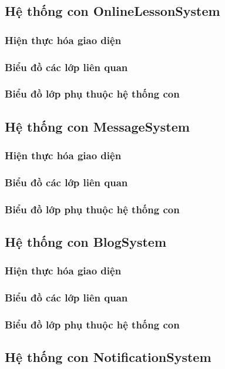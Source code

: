\documentclass[./../main.tex]{subfiles}
\begin{document}
\subsection{Hệ thống con OnlineLessonSystem}
\subsubsection{Hiện thực hóa giao diện}
\subsubsection{Biểu đồ các lớp liên quan}
\subsubsection{Biểu đồ lớp phụ thuộc hệ thống con}

\subsection{Hệ thống con MessageSystem}
\subsubsection{Hiện thực hóa giao diện}
\subsubsection{Biểu đồ các lớp liên quan}
\subsubsection{Biểu đồ lớp phụ thuộc hệ thống con}

\subsection{Hệ thống con BlogSystem}
\subsubsection{Hiện thực hóa giao diện}
\subsubsection{Biểu đồ các lớp liên quan}
\subsubsection{Biểu đồ lớp phụ thuộc hệ thống con}

\subsection{Hệ thống con NotificationSystem}
\end{document}

